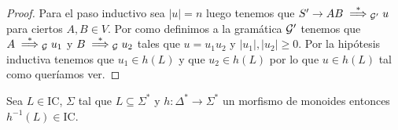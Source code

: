 \documentclass[tesis.tex]{subfiles}
\begin{document}
\begin{proof}
		Para el paso inductivo sea $|u| = n$ luego tenemos que $S' \to AB \overset{*}{\implies}_{{\cal G}'} u$ para ciertos $A, B \in V$.
		Por como definimos a la gramática ${\cal G}'$ tenemos que $A \overset{*}{\implies}_{{\cal G}} u_{1}$ y $B \overset{*}{\implies}_{{\cal G}} u_{2}$ tales que $u = u_{1}u_{2}$ y $|u_{1}|, |u_{2}| \ge 0$.
		Por la hipótesis inductiva tenemos que $u_{1} \in h(L)$ y que $u_{2} \in h(L)$ por lo que $u \in h(L)$ tal como queríamos ver.
		
\end{proof}


\begin{prop}
	Sea $L \in \text{IC}$, $\Sigma$ tal que $L \subseteq \Sigma^{*}$ y $h:\Delta^{*} \to \Sigma^*$ un morfismo de monoides 
	entonces $h^{-1}(L) \in \text{IC}$.
\end{prop}
\end{document}
